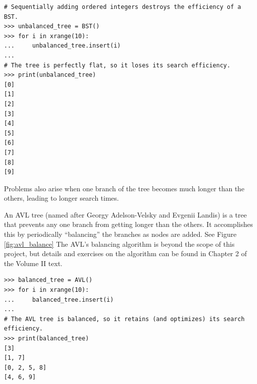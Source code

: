 \begin{lstlisting}
# Sequentially adding ordered integers destroys the efficiency of a BST.
>>> unbalanced_tree = BST()
>>> for i in xrange(10):
...     unbalanced_tree.insert(i)
... 
# The tree is perfectly flat, so it loses its search efficiency.
>>> print(unbalanced_tree)
[0]
[1]
[2]
[3]
[4]
[5]
[6]
[7]
[8]
[9]
\end{lstlisting}

Problems also arise when one branch of the tree becomes much longer than the others, leading to longer search times.

An AVL tree (named after Georgy Adelson-Velsky and Evgenii Landis) is a tree that prevents any one branch from getting longer than the others.
It accomplishes this by periodically ``balancing'' the branches as nodes are added.
See Figure \ref{fig:avl_balance}
The AVL's balancing algorithm is beyond the scope of this project, but details and exercises on the algorithm can be found in Chapter 2 of the Volume II text.

\begin{lstlisting}
>>> balanced_tree = AVL()
>>> for i in xrange(10):
...     balanced_tree.insert(i)
... 
# The AVL tree is balanced, so it retains (and optimizes) its search efficiency.
>>> print(balanced_tree)
[3]
[1, 7]
[0, 2, 5, 8]
[4, 6, 9]
\end{lstlisting}

